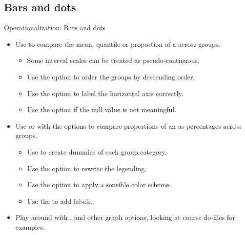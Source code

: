 \documentclass{beamer}
\begin{document}
	
	\subsection{Bars and dots}
	
	\begin{frame}[t]{Operationalization: Bars and dots}

	\begin{itemize}
		\item Use  to compare the mean, quantile or proportion of a  across groups.
		
		\begin{itemize}
			\item Some interval scales can be treated as pseudo-continuous.
			\item Use the  option to order the groups by descending order.
			\item Use the  option to label the horizontal axis correctly.
			\item Use the  option if the null value is not meaningful.
		\end{itemize}
		
		\item Use  or  with the  options to compare proportions of an  as percentages across groups.
		
		\begin{itemize}
			\item Use  to create dummies of each group category.
			\item Use the  option to rewrite the legending.
			\item Use the  option to apply a sensible color scheme.
			\item Use the  to add labels.
		\end{itemize}
		
		\item Play around with ,  and other graph options, looking at course do-files for examples.
	\end{itemize}

	\end{frame}
	
\end{document}

